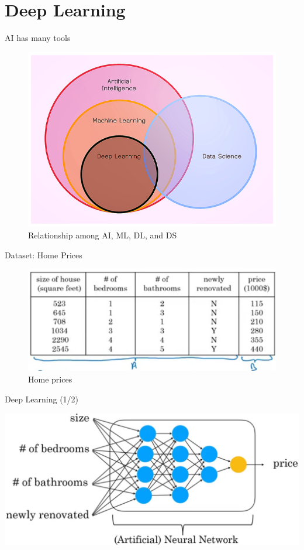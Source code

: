 \documentclass[pdf]{beamer}
\theoremstyle{mystyle}
\begin{document}
\section{Deep Learning}
\begin{frame}{AI has many tools}
	\begin{figure}[!ht]
		\centering
		\includegraphics[scale=.45]{diagram-venn-deep-learning}
		\caption{Relationship among AI, ML, DL, and DS~\citep{kharkovyna2019ABeginnersGuide}}
	\end{figure}
\end{frame}

\begin{frame}{Dataset: Home Prices}
		\begin{figure}[!ht]
		\centering
		\includegraphics[scale=.25]{ml-vs-ds}		
		\caption{Home prices~\citep{ng2019AIForEveryone}}
	\end{figure}
\end{frame}

\begin{frame}{Deep Learning (1/2)}
	\begin{center}
		\includegraphics[scale=.275]{deep-learning}
	\end{center}	
\end{frame}
\end{document}

